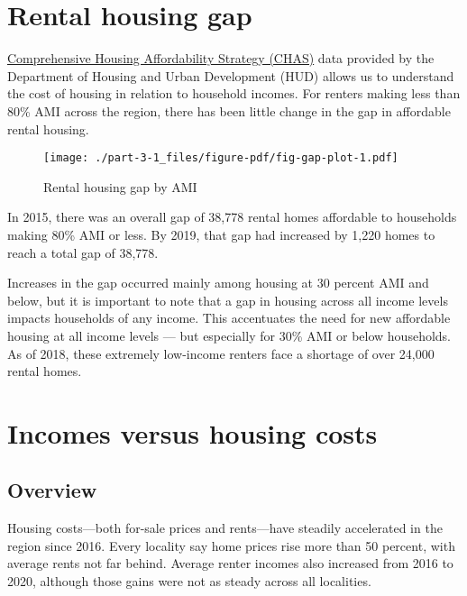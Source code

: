 \documentclass[
  letterpaper,
  DIV=11,
  numbers=noendperiod]{scrreprt}
\begin{document}
\hypertarget{rental-housing-gap}{%
\section{Rental housing gap}\label{rental-housing-gap}}

\href{https://www.huduser.gov/portal/datasets/cp.html}{Comprehensive
Housing Affordability Strategy (CHAS)} data provided by the Department
of Housing and Urban Development (HUD) allows us to understand the cost
of housing in relation to household incomes. For renters making less
than 80\% AMI across the region, there has been little change in the gap
in affordable rental housing.

\begin{figure}

{\centering \texttt{[image: ./part-3-1\_files/figure-pdf/fig-gap-plot-1.pdf]}

}

\caption{\label{fig-gap-plot}Rental housing gap by AMI}

\end{figure}

In 2015, there was an overall gap of 38,778 rental homes affordable to
households making 80\% AMI or less. By 2019, that gap had increased by
1,220 homes to reach a total gap of 38,778.

Increases in the gap occurred mainly among housing at 30 percent AMI and
below, but it is important to note that a gap in housing across all
income levels impacts households of any income. This accentuates the
need for new affordable housing at all income levels --- but especially
for 30\% AMI or below households. As of 2018, these extremely low-income
renters face a shortage of over 24,000 rental homes.

\hypertarget{incomes-versus-housing-costs}{%
\section{Incomes versus housing
costs}\label{incomes-versus-housing-costs}}

\hypertarget{overview}{%
\subsection{Overview}\label{overview}}

Housing costs---both for-sale prices and rents---have steadily
accelerated in the region since 2016. Every locality say home prices
rise more than 50 percent, with average rents not far behind. Average
renter incomes also increased from 2016 to 2020, although those gains
were not as steady across all localities.
\end{document}
